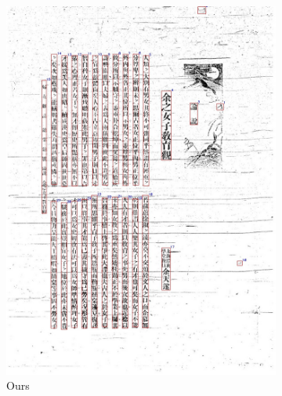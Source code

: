 \documentclass[12pt,twoside]{report}
\begin{document}
\begin{figure}[htbp]
    \centering
    \begin{subfigure}[b]{0.23\linewidth}
        \includegraphics[width=\linewidth]{./figures/samples/ours_01.jpg}
        \caption{Ours}
        \label{fig:ours_01}
    \end{subfigure}
    \hfill
    \begin{subfigure}[b]{0.23\linewidth}

\end{subfigure}
\end{figure}
\end{document}
